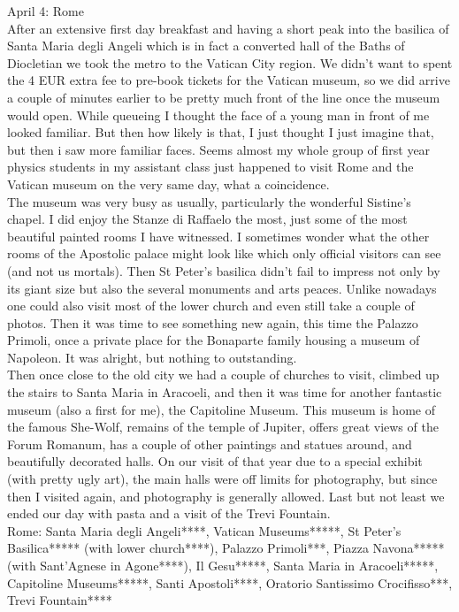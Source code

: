 April 4: Rome\\
After an extensive first day breakfast and having a short peak into the basilica of Santa Maria degli Angeli which is in fact a converted hall of the Baths of Diocletian we took the metro to the Vatican City region.
We didn't want to spent the 4 EUR extra fee to pre-book tickets for the Vatican museum, so we did arrive a couple of minutes earlier to be pretty much front of the line once the museum would open. While queueing I thought the face of a young man in front of me looked familiar. But then how likely is that, I just thought I just imagine that, but then i saw more familiar faces. Seems almost my whole group of first year physics students in my assistant class just happened to visit Rome and the Vatican museum on the very same day, what a coincidence.\\
The museum was very busy as usually, particularly the wonderful Sistine's chapel. I did enjoy the Stanze di Raffaelo the most, just some of the most beautiful painted rooms I have witnessed. I sometimes wonder what the other rooms of the Apostolic palace might look like which only official visitors can see (and not us mortals). Then St Peter's basilica didn't fail to impress not only by its giant size but also the several monuments and arts peaces. Unlike nowadays one could also visit most of the lower church and even still take a couple of photos. Then it was time to see something new again, this time the Palazzo Primoli, once a private place for the Bonaparte family housing a museum of Napoleon. It was alright, but nothing to outstanding. \\
Then once close to the old city we had a couple of churches to visit, climbed up the stairs to Santa Maria in Aracoeli, and then it was time for another fantastic museum (also a first for me), the Capitoline Museum. This museum is home of the famous She-Wolf, remains of the temple of Jupiter, offers great views of the Forum Romanum, has a couple of other paintings and statues around, and beautifully decorated halls. On our visit of that year due to a special exhibit (with pretty ugly art), the main halls were off limits for photography, but since then I visited again, and photography is generally allowed. Last but not least we ended our day with pasta and a visit of the Trevi Fountain.\\

Rome: Santa Maria degli Angeli****, Vatican Museums*****, St Peter's Basilica***** (with lower church****), Palazzo Primoli***, Piazza Navona***** (with Sant'Agnese in Agone****), Il Gesu*****, Santa Maria in Aracoeli*****, Capitoline Museums*****, Santi Apostoli****, Oratorio Santissimo Crocifisso***, Trevi Fountain****\\

